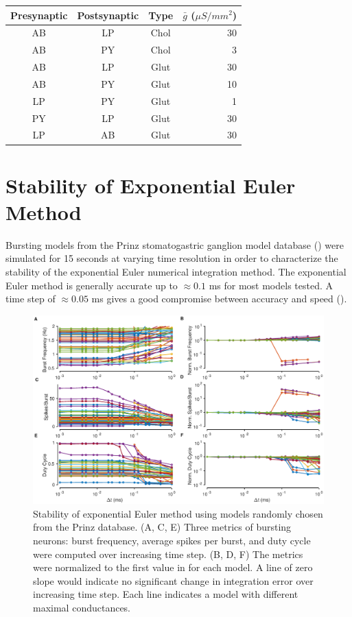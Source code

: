 \documentclass[utf8]{frontiers_suppmat} %
\begin{document}
		\begin{center}
			\begin{tabular}{|c|c|c|r|}
				\hline
				\textbf{Presynaptic} & \textbf{Postsynaptic} & \textbf{Type} & $\bar{g}$ ($\mu S/mm^2$) \\
				\hline
				AB & LP & Chol & 30 \\ \hline
				AB & PY & Chol & 3 \\ \hline
				AB & LP & Glut & 30 \\ \hline
				AB & PY & Glut & 10 \\ \hline
				LP & PY & Glut & 1 \\ \hline
				PY & LP & Glut & 30 \\ \hline
				LP & AB & Glut & 30 \\ \hline
			\end{tabular}
		\end{center}
	
\section{Stability of Exponential Euler Method}

Bursting models from the Prinz stomatogastric ganglion model database (\cite{prinzAlternativeHandtuningConductancebased2003}) were simulated for 15 seconds at varying time resolution in order to characterize the stability of the exponential Euler numerical integration method. The exponential Euler method is generally accurate up to $\approx 0.1$ ms for most models tested. A time step of $\approx 0.05$ ms gives a good compromise between accuracy and speed (\cite{prinzAlternativeHandtuningConductancebased2003, prinzSimilarNetworkActivity2004}).
	
\begin{figure}
\centering
\includegraphics[width=1.0\linewidth]{gfx/figure_sup_stability}
\caption{Stability of exponential Euler method using models randomly chosen from the Prinz database. (A, C, E) Three metrics of bursting neurons: burst frequency, average spikes per burst, and duty cycle were computed over increasing time step. (B, D, F) The metrics were normalized to the first value in for each model. A line of zero slope would indicate no significant change in integration error over increasing time step. Each line indicates a model with different maximal conductances.}
\label{fig:figuresupstability}
\end{figure}

\cleardoublepage

\printbibliography
\end{document}
